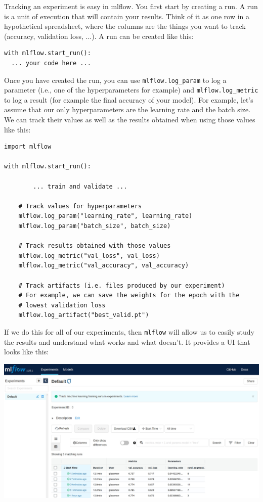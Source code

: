 Tracking an experiment is easy in mlflow. You first start by creating a run. A run is a unit of execution that will contain your results. Think of it as one row in a hypothetical spreadsheet, where the columns are the things you want to track (accuracy, validation loss, ...). A run can be created like this:
\begin{lstlisting}
with mlflow.start_run():
  ... your code here ...
\end{lstlisting}
Once you have created the run, you can use \lstinline{mlflow.log_param} to log a parameter (i.e., one of the hyperparameters for example) and \lstinline{mlflow.log_metric} to log a result (for example the final accuracy of your model). For example, let's assume that our only hyperparameters are the learning rate and the batch size. We can track their values as well as the results obtained when using those values like this:
\begin{lstlisting}
import mlflow

with mlflow.start_run():

        ... train and validate ...

    # Track values for hyperparameters    
    mlflow.log_param("learning_rate", learning_rate)
    mlflow.log_param("batch_size", batch_size)

    # Track results obtained with those values
    mlflow.log_metric("val_loss", val_loss)
    mlflow.log_metric("val_accuracy", val_accuracy)

    # Track artifacts (i.e. files produced by our experiment)
    # For example, we can save the weights for the epoch with the
    # lowest validation loss
    mlflow.log_artifact("best_valid.pt")
\end{lstlisting}
If we do this for all of our experiments, then \lstinline|mlflow| will allow us to easily study the results and understand what works and what doesn't. It provides a UI that looks like this:

\includegraphics[width=1\linewidth]{img//cnn//depth/mlflow.jpeg}

